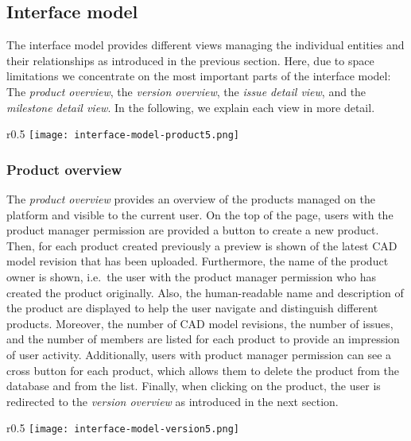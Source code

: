 \subsection{Interface model}

The interface model provides different views managing the individual entities and their relationships as introduced in the previous section.
Here, due to space limitations we concentrate on the most important parts of the interface model: The \textit{product overview}, the \textit{version overview}, the \textit{issue detail view}, and the \textit{milestone detail view}.
In the following, we explain each view in more detail.

\begin{wrapfigure}{r}{0.5\textwidth}
    \centering
    \texttt{[image: interface-model-product5.png]}
    \label{fig:screenshot-product}
\end{wrapfigure}

\subsubsection{Product overview}

The \textit{product overview} provides an overview of the products managed on the platform and visible to the current user.
On the top of the page, users with the product manager permission are provided a button to create a new product.
Then, for each product created previously a preview is shown of the latest CAD model revision that has been uploaded.
Furthermore, the name of the product owner is shown, i.e.\ the user with the product manager permission who has created the product originally.
Also, the human-readable name and description of the product are displayed to help the user navigate and distinguish different products.
Moreover, the number of CAD model revisions, the number of issues, and the number of members are listed for each product to provide an impression of user activity.
Additionally, users with product manager permission can see a cross button for each product, which allows them to delete the product from the database and from the list.
Finally, when clicking on the product, the user is redirected to the \textit{version overview} as introduced in the next section.

\begin{wrapfigure}{r}{0.5\textwidth}
    \centering
    \texttt{[image: interface-model-version5.png]}
    \label{fig:screenshot-version}
\end{wrapfigure}

